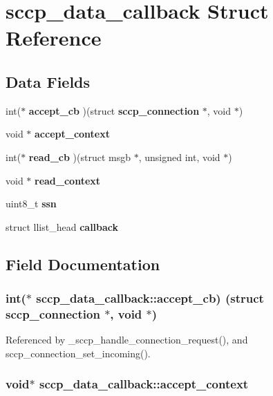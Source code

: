 \section{sccp\+\_\+data\+\_\+callback Struct Reference}
\label{structsccp__data__callback}
\subsection*{Data Fields}
\begin{DoxyCompactItemize}
\item 
int($\ast$ {\bf accept\+\_\+cb} )(struct {\bf sccp\+\_\+connection} $\ast$, void $\ast$)
\item 
void $\ast$ {\bf accept\+\_\+context}
\item 
int($\ast$ {\bf read\+\_\+cb} )(struct msgb $\ast$, unsigned int, void $\ast$)
\item 
void $\ast$ {\bf read\+\_\+context}
\item 
uint8\+\_\+t {\bf ssn}
\item 
struct llist\+\_\+head {\bf callback}
\end{DoxyCompactItemize}


\subsection{Field Documentation}
\subsubsection[{accept\+\_\+cb}]{\setlength{\rightskip}{0pt plus 5cm}int($\ast$ sccp\+\_\+data\+\_\+callback\+::accept\+\_\+cb) (struct {\bf sccp\+\_\+connection} $\ast$, void $\ast$)}\label{structsccp__data__callback_af1f7c2710544a491439b3b153162bd15}


Referenced by \+\_\+sccp\+\_\+handle\+\_\+connection\+\_\+request(), and sccp\+\_\+connection\+\_\+set\+\_\+incoming().

\subsubsection[{accept\+\_\+context}]{\setlength{\rightskip}{0pt plus 5cm}void$\ast$ sccp\+\_\+data\+\_\+callback\+::accept\+\_\+context}\label{structsccp__data__callback_a50ccab9dfc5044fe70fc9effb5d94c61}


